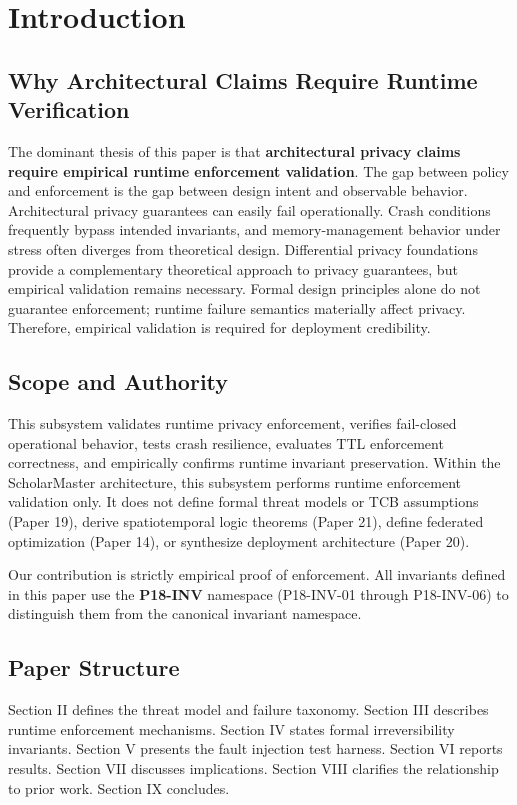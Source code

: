 \documentclass[conference]{IEEEtran}
\begin{document}
\section{Introduction}

\subsection{Why Architectural Claims Require Runtime Verification}
The dominant thesis of this paper is that \textbf{architectural privacy claims require empirical runtime enforcement validation}. The gap between policy and enforcement is the gap between design intent and observable behavior. Architectural privacy guarantees can easily fail operationally. Crash conditions frequently bypass intended invariants, and memory-management behavior under stress often diverges from theoretical design. Differential privacy foundations \cite{b9} provide a complementary theoretical approach to privacy guarantees, but empirical validation remains necessary. Formal design principles alone do not guarantee enforcement; runtime failure semantics materially affect privacy. Therefore, empirical validation is required for deployment credibility. 

\subsection{Scope and Authority}
This subsystem validates runtime privacy enforcement, verifies fail-closed operational behavior, tests crash resilience, evaluates TTL enforcement correctness, and empirically confirms runtime invariant preservation. Within the ScholarMaster architecture, this subsystem performs runtime enforcement validation only. It does not define formal threat models or TCB assumptions (Paper 19), derive spatiotemporal logic theorems (Paper 21), define federated optimization (Paper 14), or synthesize deployment architecture (Paper 20). 

Our contribution is strictly empirical proof of enforcement. All invariants defined in this paper use the \textbf{P18-INV} namespace (P18-INV-01 through P18-INV-06) to distinguish them from the canonical invariant namespace.

\subsection{Paper Structure}
Section II defines the threat model and failure taxonomy. Section III describes runtime enforcement mechanisms. Section IV states formal irreversibility invariants. Section V presents the fault injection test harness. Section VI reports results. Section VII discusses implications. Section VIII clarifies the relationship to prior work. Section IX concludes.
\end{document}

